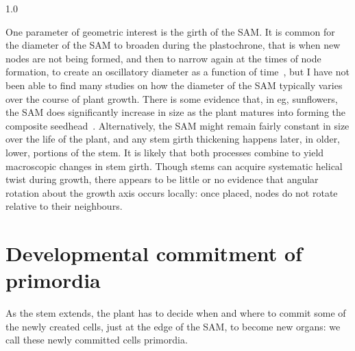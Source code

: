 %
{1.0}


One parameter of geometric interest is the girth of the SAM.  It is common for the diameter of the SAM to broaden during the plastochrone, that is when new nodes are not being formed, and then to narrow again at the times of node formation, to create an oscillatory diameter as a function of time~\autocite{cronkMolecularOrganographyPlants2009}, but I have not been able to find many studies on how the diameter of the SAM typically varies over the course of plant growth. There is some evidence that, in eg, sunflowers, the SAM does significantly increase in size as the plant matures into forming the composite seedhead~\cite{palmerPhysiologicalBasisPattern1998}. Alternatively, the SAM might remain fairly constant in size over the life of the plant, and any stem girth thickening happens later, in older,  lower, portions of the stem. It is likely that both processes combine to yield  macroscopic changes in stem girth. Though stems can acquire systematic helical twist during growth, there appears to be little or no evidence that angular rotation about the growth axis occurs locally: once placed,  nodes do not rotate relative to their neighbours.



\section{Developmental commitment of primordia}


As the stem extends, the plant has to decide when and where to commit some of the newly created cells, just at the edge of the SAM, to become new organs: we call these newly committed cells primordia.

